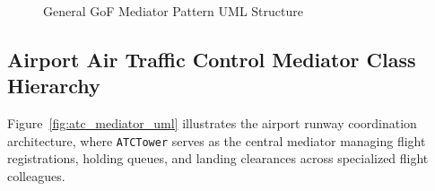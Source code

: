 \documentclass[12pt,a4paper]{article}
\begin{document}
\begin{figure}[htbp]
{
}
\caption{General GoF Mediator Pattern UML Structure}
\label{fig:general_mediator_uml}
\end{figure}

\subsection{Airport Air Traffic Control Mediator Class Hierarchy}
Figure~\ref{fig:atc_mediator_uml} illustrates the airport runway coordination architecture, where \texttt{ATCTower} serves as the central mediator managing flight registrations, holding queues, and landing clearances across specialized flight colleagues.
\end{document}
